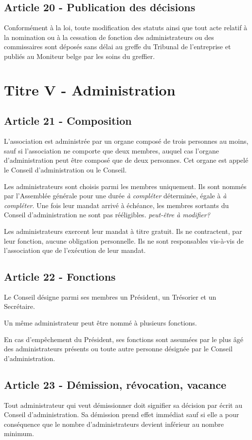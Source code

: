 \documentclass[12pt]{article}
\begin{document}
\subsection*{Article 20 - Publication des décisions}
Conformément à la loi, toute modification des statuts ainsi que tout acte relatif à la nomination ou à la cessation de fonction des administrateurs ou des commissaires sont déposés sans délai au greffe du Tribunal de l'entreprise et publiés au Moniteur belge par les soins du greffier.

\section*{Titre V - Administration}
\subsection*{Article 21 - Composition}
L'association est administrée par un organe composé de trois personnes au moins, sauf si l'association ne comporte que deux membres, auquel cas l'organe d'administration peut être composé que de deux personnes. Cet organe est appelé le Conseil d'administration ou le Conseil.

Les administrateurs sont choisis parmi les membres uniquement. Ils sont nommés par l'Assemblée générale pour une durée \emph{à compléter} déterminée, égale à \emph{à compléter}. Une fois leur mandat arrivé à échéance, les membres sortants du Conseil d'administration ne sont pas rééligibles. \emph{peut-être à modifier?}

Les administrateurs exercent leur mandat à titre gratuit. Ils ne contractent, par leur fonction, aucune obligation personnelle. Ils ne sont responsables vis-à-vis de l'association que de l'exécution de leur mandat.

\subsection*{Article 22 - Fonctions}
Le Conseil désigne parmi ses membres un Président, un Trésorier et un Secrétaire.

Un même administrateur peut être nommé à plusieurs fonctions.

En cas d'empêchement du Président, ses fonctions sont assumées par le plus âgé des administrateurs présents ou toute autre personne désignée par le Conseil d'administration.

\subsection*{Article 23 - Démission, révocation, vacance}
Tout administrateur qui veut démissionner doit signifier sa décision par écrit au Conseil d'administration. Sa démission prend effet immédiat sauf si elle a pour conséquence que le nombre d'administrateurs devient inférieur au nombre minimum.
\end{document}
